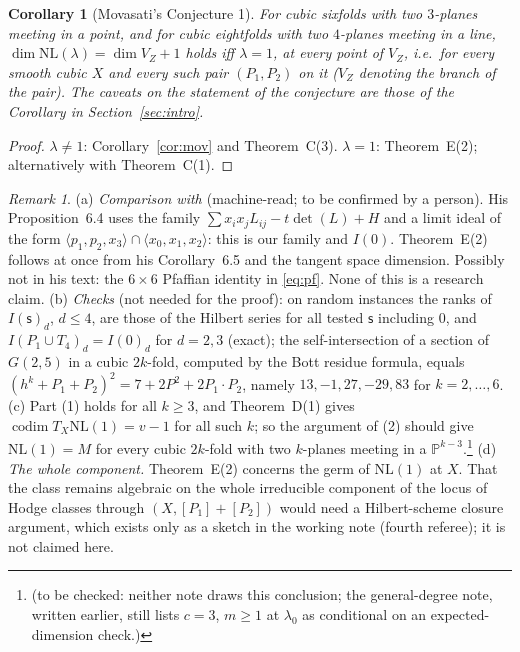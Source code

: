 \documentclass[10pt]{article}
\numberwithin{equation}{section}
\newtheorem{corollary}[theorem]{Corollary}
\theoremstyle{remark}
\newtheorem{remark}[theorem]{Remark}
\newcommand{\PP}{\mathbb{P}}
\newcommand{\NL}{\mathrm{NL}}
\newcommand{\VZ}{V_Z}
\newcommand{\codim}{\operatorname{codim}}
\newcommand{\tbc}[1]{\footnote{(to be checked: #1)}}
\begin{document}
\begin{corollary}[Movasati's Conjecture 1]\label{cor:main}
For cubic sixfolds with two $3$-planes meeting in a point, and for cubic eightfolds with two $4$-planes meeting
in a line, $\dim\NL(\lambda)=\dim\VZ+1$ holds iff $\lambda=1$, at every point of $\VZ$, i.e.\ for every smooth
cubic $X$ and every such pair $(P_1,P_2)$ on it \textup{(}$\VZ$ denoting the branch of the pair\textup{)}. The
caveats on the statement of the conjecture are those of the Corollary in Section~\ref{sec:intro}.
\end{corollary}
\begin{proof}
$\lambda\ne1$: Corollary~\ref{cor:mov} and Theorem~C(3). $\lambda=1$: Theorem~E(2); alternatively
\cite[Cor.~6.5]{Kl1} with Theorem~C(1).
\end{proof}

\begin{remark}\label{rem:E}
(a) \emph{Comparison with \cite{Kl1}} (machine-read; to be confirmed by a person). His Proposition~6.4 uses the
family $\sum x_ix_jL_{ij}-t\det(L)+H$ and a limit ideal of the form $\langle p_1,p_2,x_3\rangle\cap\langle
x_0,x_1,x_2\rangle$: this is our family and $I(0)$. Theorem~E(2) follows at once from his Corollary~6.5 and the
tangent space dimension. Possibly not in his text: the $6\times6$ Pfaffian identity in \eqref{eq:pf}. None of
this is a research claim.
(b) \emph{Checks} (not needed for the proof): on random instances the ranks of $I(\mathsf s)_d$, $d\le4$, are
those of the Hilbert series for all tested $\mathsf s$ including $0$, and $I(P_1\cup T_4)_d=I(0)_d$ for
$d=2,3$ (exact); the self-intersection of a section of $G(2,5)$ in a cubic $2k$-fold, computed by the Bott
residue formula, equals $(h^k+P_1+P_2)^2=7+2P^2+2P_1\cdot P_2$, namely $13,-1,27,-29,83$ for $k=2,\dots,6$.
(c) Part (1) holds for all $k\ge3$, and Theorem~D(1) gives $\codim T_X\NL(1)=v-1$ for all such $k$; so the
argument of (2) should give $\NL(1)=M$ for every cubic $2k$-fold with two $k$-planes meeting in a
$\PP^{k-3}$.\tbc{neither note draws this conclusion; the general-degree note, written earlier, still lists
$c=3$, $m\ge1$ at $\lambda_0$ as conditional on an expected-dimension check.}
(d) \emph{The whole component.} Theorem~E(2) concerns the germ of $\NL(1)$ at $X$. That the class remains
algebraic on the whole irreducible component of the locus of Hodge classes through $(X,[P_1]+[P_2])$ would need
a Hilbert-scheme closure argument, which exists only as a sketch in the working note (fourth referee); it is not
claimed here.
\end{remark}
\end{document}
